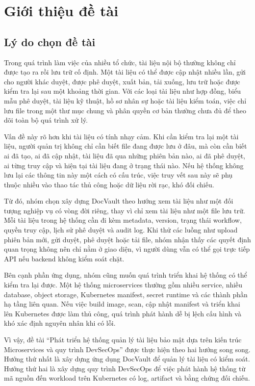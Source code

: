 \chapter{Giới thiệu đề tài}

\section{Lý do chọn đề tài}

Trong quá trình làm việc của nhiều tổ chức, tài liệu nội bộ thường không chỉ được tạo ra rồi lưu trữ cố định. Một tài liệu có thể được cập nhật nhiều lần, gửi cho người khác duyệt, được phê duyệt, xuất bản, tải xuống, lưu trữ hoặc được kiểm tra lại sau một khoảng thời gian. Với các loại tài liệu như hợp đồng, biểu mẫu phê duyệt, tài liệu kỹ thuật, hồ sơ nhân sự hoặc tài liệu kiểm toán, việc chỉ lưu file trong một thư mục chung và phân quyền cơ bản thường chưa đủ để theo dõi toàn bộ quá trình xử lý.

Vấn đề này rõ hơn khi tài liệu có tính nhạy cảm. Khi cần kiểm tra lại một tài liệu, người quản trị không chỉ cần biết file đang được lưu ở đâu, mà còn cần biết ai đã tạo, ai đã cập nhật, tài liệu đã qua những phiên bản nào, ai đã phê duyệt, ai từng truy cập và hiện tại tài liệu đang ở trạng thái nào. Nếu hệ thống không lưu lại các thông tin này một cách có cấu trúc, việc truy vết sau này sẽ phụ thuộc nhiều vào thao tác thủ công hoặc dữ liệu rời rạc, khó đối chiếu.

Từ đó, nhóm chọn xây dựng DocVault theo hướng xem tài liệu như một đối tượng nghiệp vụ có vòng đời riêng, thay vì chỉ xem tài liệu như một file lưu trữ. Mỗi tài liệu trong hệ thống cần đi kèm metadata, version, trạng thái workflow, quyền truy cập, lịch sử phê duyệt và audit log. Khi thử các luồng như upload phiên bản mới, gửi duyệt, phê duyệt hoặc tải file, nhóm nhận thấy các quyết định quan trọng không nên chỉ nằm ở giao diện, vì người dùng vẫn có thể gọi trực tiếp API nếu backend không kiểm soát chặt.

Bên cạnh phần ứng dụng, nhóm cũng muốn quá trình triển khai hệ thống có thể kiểm tra lại được. Một hệ thống microservices thường gồm nhiều service, nhiều database, object storage, Kubernetes manifest, secret runtime và các thành phần hạ tầng liên quan. Nếu việc build image, scan, cập nhật manifest và triển khai lên Kubernetes được làm thủ công, quá trình phát hành dễ bị lệch cấu hình và khó xác định nguyên nhân khi có lỗi.

Vì vậy, đề tài ``Phát triển hệ thống quản lý tài liệu bảo mật dựa trên kiến trúc Microservices và quy trình DevSecOps'' được thực hiện theo hai hướng song song. Hướng thứ nhất là xây dựng ứng dụng DocVault để quản lý tài liệu có kiểm soát. Hướng thứ hai là xây dựng quy trình DevSecOps để việc phát hành hệ thống từ mã nguồn đến workload trên Kubernetes có log, artifact và bằng chứng đối chiếu.

